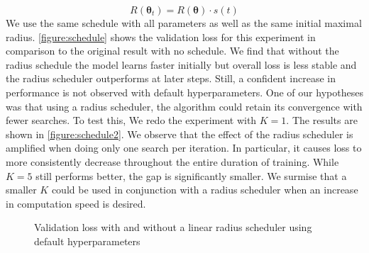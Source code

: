 \begin{equation}
    R(\bm{\theta}_t) = R(\bm{\theta}) \cdot s(t)
\end{equation}
We use the same schedule with all parameters as well as 
the same initial maximal radius. \autoref{figure:schedule}
shows the validation loss for this experiment in comparison
to the original result with no schedule. 
We find that 
without the radius schedule the model learns faster 
initially but overall loss is less stable and 
the radius scheduler outperforms at later steps. 
Still, a confident increase in performance is not 
observed with default hyperparameters. 
One of our hypotheses was that using a radius scheduler,
the algorithm could retain its convergence with 
fewer searches. To test this, 
We redo the experiment with $K=1$. The results are shown in 
\autoref{figure:schedule2}.
We observe that the effect of the radius scheduler 
is amplified when doing only one search per iteration.
In particular, it causes loss to more consistently decrease 
throughout the entire duration of training. 
While $K=5$ still performs better, the gap is significantly
smaller. We surmise that a smaller $K$ could be used in 
conjunction with a radius scheduler when an increase in 
computation speed is desired.


\begin{figure}
    \centering
    \caption[Validation loss with and without a radius scheduler]
    {Validation loss with and without a linear radius 
    scheduler using default hyperparameters}
    \label{figure:schedule}
\end{figure}

